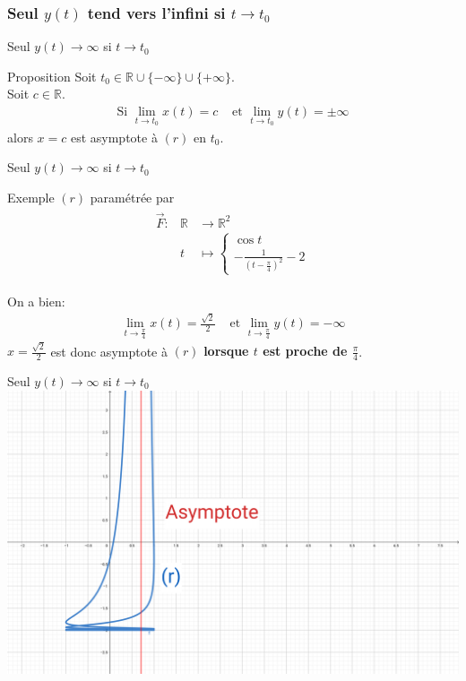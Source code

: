 \documentclass[14pt]{beamer}
\begin{document}
\subsubsection{Seul $y(t)$ tend vers l'infini si $t \to t_0$}
\begin{frame}{Seul $y(t)\to\infty$ si $t \to t_0$}
        \begin{alertblock}{Proposition}
                Soit $t_0\in\mathbb{R}\cup\{-\infty\}\cup\{+\infty\}$.\\
                Soit $c\in\mathbb{R}$.
                \begin{align*}
                        \text{Si } \lim_{t\to t_0}x(t)=c & \text{ et }\lim_{t\to t_0}y(t)=\pm\infty
                \end{align*}
                alors $x=c$ est asymptote à $(r)$ en $t_0$.
        \end{alertblock}
\end{frame}
\begin{frame}{Seul $y(t)\to\infty$ si $t \to t_0$}
        \begin{exampleblock}{Exemple $(r)$ paramétrée par}
        \begin{align*}
                \begin{array}{lll}
                        \vec{F}: & \mathbb{R} &\to \mathbb{R}^2\\
                        & t &\mapsto \left\{\begin{array}{l}\cos t\\-\frac{1}{(t-\frac{\pi}{4})^2}-2\end{array}\right.
                \end{array}
        \end{align*}
        \end{exampleblock}
        On a bien:
        \begin{align*}
                \lim_{t\to \frac{\pi}{4}}x(t)=\frac{\sqrt{2}}{2} & \text{ et }\lim_{t\to \frac{\pi}{4}}y(t)=-\infty
        \end{align*}
        $x=\frac{\sqrt{2}}{2}$ est donc asymptote à $(r)$ \textbf{lorsque $t$ est proche de $\frac{\pi}{4}$}.
\end{frame}

\begin{frame}{Seul $y(t)\to\infty$ si $t \to t_0$}
        \includegraphics[height=0.8\textheight]{images/Asymptote_01.png}
\end{frame}
\end{document}
